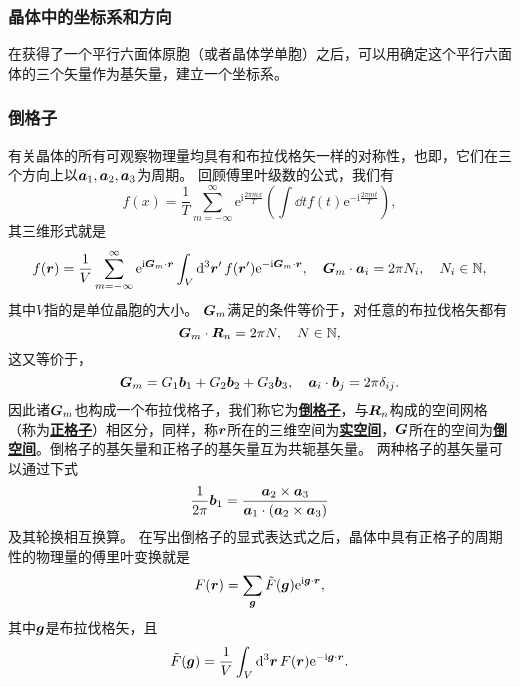 \documentclass[hyperref, UTF8, a4paper]{ctexart}
\newcommand*{\ii}{\mathrm{i}}
\newcommand*{\ee}{\mathrm{e}}
\newcommand*{\concept}[1]{\underline{\textbf{#1}}}
\begin{document}
\subsubsection{晶体中的坐标系和方向}


在获得了一个平行六面体原胞（或者晶体学单胞）之后，可以用确定这个平行六面体的三个矢量作为基矢量，建立一个坐标系。

\subsubsection{倒格子}

有关晶体的所有可观察物理量均具有和布拉伐格矢一样的对称性，也即，它们在三个方向上以$\vb*{a}_1,\vb*{a}_2,\vb*{a}_3$为周期。
回顾傅里叶级数的公式，我们有
\[
    f(x) = \frac{1}{T} \sum_{m=-\infty}^\infty \ee^{\ii \frac{2\pi m x}{T}} \left(\int \dd{t} f(t) \ee^{-\ii \frac{2\pi m t}{T}}\right) ,
\]
其三维形式就是
\[
    f(\vb*{r}) = \frac{1}{V} \sum_{m=-\infty}^\infty \ee^{\ii \vb*{G}_m \cdot \vb*{r}} \int_V \dd[3]{\vb*{r}'} f(\vb*{r}') \ee^{- \ii \vb*{G}_m \cdot \vb*{r}}, \quad \vb*{G}_m \cdot \vb*{a}_i = 2\pi N_i, \quad N_i \in \mathbb{N},
\]
其中$V$指的是单位晶胞的大小。
$\vb*{G}_m$满足的条件等价于，对任意的布拉伐格矢都有
\begin{equation}
    \vb*{G}_m \cdot \vb*{R}_n = 2\pi N, \quad N \in \mathbb{N},
\end{equation}
这又等价于，
\begin{equation}
    \vb*{G}_m = G_1 \vb*{b}_1 + G_2 \vb*{b}_2 + G_3 \vb*{b}_3, \quad \vb*{a}_i \cdot \vb*{b}_j = 2 \pi \delta_{ij}.
\end{equation}
因此诸$\vb*{G}_m$也构成一个布拉伐格子，我们称它为\concept{倒格子}，与$\vb*{R}_n$构成的空间网格（称为\concept{正格子}）相区分，同样，称$\vb*{r}$所在的三维空间为\concept{实空间}，$\vb*{G}$所在的空间为\concept{倒空间}。倒格子的基矢量和正格子的基矢量互为共轭基矢量。
两种格子的基矢量可以通过下式
\begin{equation}
    \frac{1}{2\pi} \vb*{b}_1 = \frac{\vb*{a}_2 \times \vb*{a}_3}{\vb*{a}_1 \cdot (\vb*{a}_2 \times \vb*{a}_3)}
\end{equation}
及其轮换相互换算。
在写出倒格子的显式表达式之后，晶体中具有正格子的周期性的物理量的傅里叶变换就是
\begin{equation}
    F(\vb*{r}) = \sum_{\vb*{g}} \tilde{F}(\vb*{g}) \ee^{\ii \vb*{g} \cdot \vb*{r}},
\end{equation}
其中$\vb*{g}$是布拉伐格矢，且
\begin{equation}
    \tilde{F}(\vb*{g}) = \frac{1}{V} \int_V \dd[3]{\vb*{r}} F(\vb*{r}) \ee^{-\ii \vb*{g} \cdot \vb*{r}}.
\end{equation}
\end{document}
